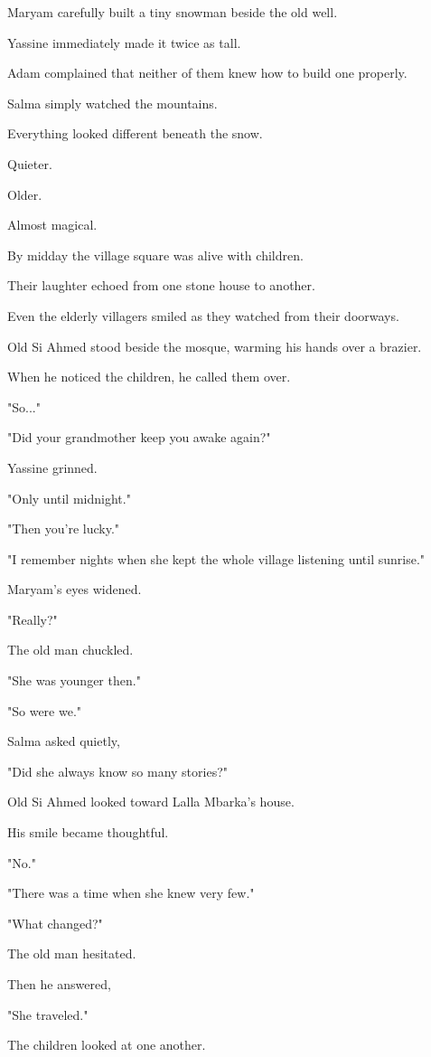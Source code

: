 \documentclass[12pt,openany]{book}
\begin{document}
Maryam carefully built a tiny snowman beside the old well.

Yassine immediately made it twice as tall.

Adam complained that neither of them knew how to build one properly.

Salma simply watched the mountains.

Everything looked different beneath the snow.

Quieter.

Older.

Almost magical.

By midday the village square was alive with children.

Their laughter echoed from one stone house to another.

Even the elderly villagers smiled as they watched from their doorways.

Old Si Ahmed stood beside the mosque, warming his hands over a brazier.

When he noticed the children, he called them over.

"So..."

"Did your grandmother keep you awake again?"

Yassine grinned.

"Only until midnight."

"Then you're lucky."

"I remember nights when she kept the whole village listening until sunrise."

Maryam's eyes widened.

"Really?"

The old man chuckled.

"She was younger then."

"So were we."

Salma asked quietly,

"Did she always know so many stories?"

Old Si Ahmed looked toward Lalla Mbarka's house.

His smile became thoughtful.

"No."

"There was a time when she knew very few."

"What changed?"

The old man hesitated.

Then he answered,

"She traveled."

The children looked at one another.
\end{document}
